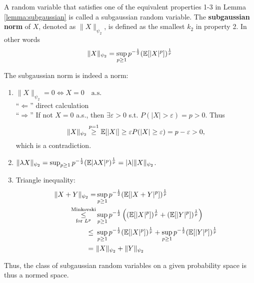 \vspace{-2.85pc}
\begin{definition}
\begin{mdframed}
A random variable that satisfies one of the equivalent properties 1-3 in Lemma \ref{lemma:subgaussian} is called a subgaussian random variable. The \textbf{subgaussian norm} of $X$, denoted as $\|X\|_{\psi_2}$, is defined as the smallest $k_2$ in property 2. In other words\vspace{-0.5pc}
\begin{equation*}
\|X\|_{\psi_2} = \sup_{p\geq 1} p^{-\frac{1}{2}}(\E[|X|^p])^\frac{1}{p} \vspace{-0.1pc}
\end{equation*}
\end{mdframed}
\newpage
\begin{remark*}
The subgaussian norm is indeed a norm: %
\begin{enumerate}[itemsep = 0pc]
\item $\|X\|_{\psi_2} = 0 \iff X=0 \quad \text{a.s.}$\\
``$\Leftarrow$'' direct calculation \\
``$\Rightarrow$'' If not $X=0$ a.s., then $\exists \varepsilon>0$ s.t. $P(|X|>\varepsilon)=p>0$. Thus $$\|X\|_{\psi_2} \overset{p=1}\geq \mathbb{E}[|X|] \geq \varepsilon P(|X|\geq \varepsilon) = p-\varepsilon>0, $$
which is a contradiction.
\item $\|\lambda X\|_{\psi_2} = \sup_{p\geq 1} p^{-\frac{1}{2}}(\mathbb{E}|\lambda X|^p)^{\frac{1}{p}} = |\lambda| \|X\|_{\psi_2}$.
\item Triangle inequality:
\begin{equation*}
\begin{split}
\|X+Y\|_{\psi_2} = & \sup_{p\geq 1} p^{-\frac{1}{2}}(\mathbb{E}[|X+Y|^p])^{\frac{1}{p}} \\
\underset{\text{for }L^p}{\overset{\text{Minkovski}}\leq} & \sup_{p\geq 1} p^{-\frac{1}{2}} \left( (\mathbb{E}[|X|^p])^{\frac{1}{p}}+(\mathbb{E}[|Y|^p])^{\frac{1}{p}} \right) \\
\leq \ & \sup_{p\geq 1}  p^{-\frac{1}{2}}  (\mathbb{E}[|X|^p])^{\frac{1}{p}}+ \sup_{p\geq 1}  p^{-\frac{1}{2}}(\mathbb{E}[|Y|^p])^{\frac{1}{p}}  \\
= \ & \|X\|_{\psi_2} + \|Y\|_{\psi_2}
\end{split}
\end{equation*}
\end{enumerate}
Thus, the class of subgaussian random variables on a given probability space is thus a normed space.\\\\

\end{remark*}
\end{definition}
